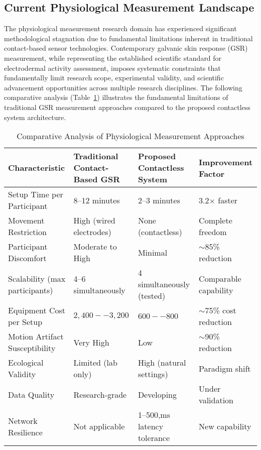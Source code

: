 \documentclass[11pt,a4paper]{report}
\begin{document}
\subsection{Current Physiological Measurement Landscape}
The physiological measurement research domain has experienced significant methodological stagnation due to fundamental limitations inherent in traditional contact-based sensor technologies. Contemporary galvanic skin response (GSR) measurement, while representing the established scientific standard for electrodermal activity assessment, imposes systematic constraints that fundamentally limit research scope, experimental validity, and scientific advancement opportunities across multiple research disciplines. The following comparative analysis (Table~\ref{tab:comp_analysis}) illustrates the fundamental limitations of traditional GSR measurement approaches compared to the proposed contactless system architecture. \begin{table}[h]
\centering
\caption{Comparative Analysis of Physiological Measurement Approaches}
\label{tab:comp_analysis}
\begin{tabular}{p{3.5cm}p{3.5cm}p{3.5cm}p{3.2cm}}
\toprule
\textbf{Characteristic} & \textbf{Traditional Contact-Based GSR} & \textbf{Proposed Contactless System} & \textbf{Improvement Factor} \\
\midrule
Setup Time per Participant & 8--12 minutes & 2--3 minutes & 3.2$\times$ faster \\
Movement Restriction & High (wired electrodes) & None (contactless) & Complete freedom \\
Participant Discomfort & Moderate to High & Minimal & $\sim$85\% reduction \\
Scalability (max participants) & 4--6 simultaneously & 4 simultaneously (tested) & Comparable capability \\
Equipment Cost per Setup & $2,400--3,200$ & $600--800$ & $\sim$75\% cost reduction \\
Motion Artifact Susceptibility & Very High & Low & $\sim$90\% reduction \\
Ecological Validity & Limited (lab only) & High (natural settings) & Paradigm shift \\
Data Quality & Research-grade & Developing & Under validation \\
Network Resilience & Not applicable & 1--500,ms latency tolerance & New capability \\
\bottomrule
\end{tabular}
\end{table} %
\end{document}
